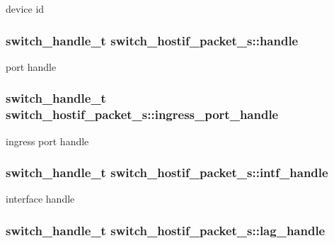 device id \hypertarget{structswitch__hostif__packet__s_a0afca65ef0c09c446b9bbed2eb41c4cb}{
\subsubsection[{handle}]{\setlength{\rightskip}{0pt plus 5cm}switch\+\_\+handle\+\_\+t switch\+\_\+hostif\+\_\+packet\+\_\+s\+::handle}}\label{structswitch__hostif__packet__s_a0afca65ef0c09c446b9bbed2eb41c4cb}
port handle \hypertarget{structswitch__hostif__packet__s_a613ae4e693a0e113d6c122d45a83a718}{
\subsubsection[{ingress\+\_\+port\+\_\+handle}]{\setlength{\rightskip}{0pt plus 5cm}switch\+\_\+handle\+\_\+t switch\+\_\+hostif\+\_\+packet\+\_\+s\+::ingress\+\_\+port\+\_\+handle}}\label{structswitch__hostif__packet__s_a613ae4e693a0e113d6c122d45a83a718}
ingress port handle \hypertarget{structswitch__hostif__packet__s_aa98edd1c4f3468c3aadef8980ea157a9}{
\subsubsection[{intf\+\_\+handle}]{\setlength{\rightskip}{0pt plus 5cm}switch\+\_\+handle\+\_\+t switch\+\_\+hostif\+\_\+packet\+\_\+s\+::intf\+\_\+handle}}\label{structswitch__hostif__packet__s_aa98edd1c4f3468c3aadef8980ea157a9}
interface handle \hypertarget{structswitch__hostif__packet__s_ac1010713f560f3ab5ee2722c4c5c8771}{
\subsubsection[{lag\+\_\+handle}]{\setlength{\rightskip}{0pt plus 5cm}switch\+\_\+handle\+\_\+t switch\+\_\+hostif\+\_\+packet\+\_\+s\+::lag\+\_\+handle}}\label{structswitch__hostif__packet__s_ac1010713f560f3ab5ee2722c4c5c8771}
